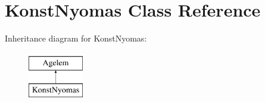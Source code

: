 \hypertarget{class_konst_nyomas}{}\section{Konst\+Nyomas Class Reference}
\label{class_konst_nyomas}
Inheritance diagram for Konst\+Nyomas\+:\begin{figure}[H]
\begin{center}
\leavevmode
\includegraphics[height=2.000000cm]{class_konst_nyomas}
\end{center}
\end{figure}
